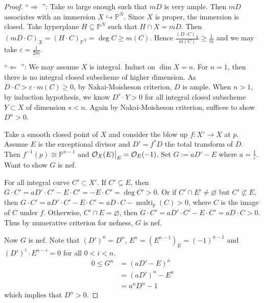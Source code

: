\documentclass{ctexart}
\newcommand{\leftquotes}{\textquotedblleft}
\newcommand{\rightquotes}{\textquotedblright}
\newcommand{\multiplicity}{\operatorname{multi}}
\begin{document}
\begin{proof}
    \leftquotes $\Rightarrow$ \rightquotes : Take $m$ large enough such that $mD$ is very ample.
    Then $mD$ associates with an immersion $X \hookrightarrow \mathbb{P}^{N}$.
    Since $X$ is proper, the immersion is closed.
    Take hyperplane $H \subseteq \mathbb{P}^{N}$ such that $H \cap X = mD$.
    Then $(mD \cdot C)_{X} = (H \cdot C)_{\mathbb{P}^{N}} = \deg C \ge m(C)$.
    Hence $\frac{(D \cdot C)_{X}}{m(C)} \ge \frac{1}{m}$ and we may take $\varepsilon = \frac{1}{2m}$. 
    \par
    \leftquotes $\Leftarrow$ \rightquotes : We may assume $X$ is integral.
    Induct on $\dim X = n$.
    For $n = 1$, then there is no integral closed subscheme of higher dimension.
    As $D \cdot C > \varepsilon \cdot m(C) \ge 0$, by Nakai-Moisheson criterion, $D$ is ample.
    When $n > 1$, by induction hypothesis, we know $D^{s} \cdot Y > 0$ for all integral closed subscheme $Y \subset X$ of dimension $s < n$.
    Again by Nakai-Moisheson criterion, suffices to show $D^{n} > 0$.
    \par
    Take a smooth closed point of $X$ and consider the blow up $f: X' \rightarrow X$ at $p$.
    Assume $E$ is the exceptional divisor and $D' = f^{\ast}D$ the total transform of $D$.
    Then $f^{-1}(p) \cong \mathbb{P}^{n - 1}$ and $\mathcal{O}_{X}(E)\big{|}_{E} = \mathcal{O}_{E}(-1)$.
    Set $G := aD' - E$ where $a = \frac{1}{\varepsilon}$.
    Want to show $G$ is nef.
    \par
    For all integral curve $C' \subset X'$.
    If $C' \subseteq E$, then $G \cdot C' = aD' \cdot C' - E \cdot C' = -E \cdot C' = \deg C' > 0$.
    Or if $C' \cap E' \neq \varnothing$ but $C' \not\subset E$, then $G \cdot C' = aD' \cdot C' - E \cdot C' = aD \cdot C - \multiplicity_{p}(C) > 0$,
    where $C$ is the image of $C$ under $f$.
    Otherwise, $C' \cap E = \varnothing$, then $G \cdot C' = aD' \cdot C' - E \cdot C' = aD \cdot C > 0$.
    Thus by numerative criterion for nefness, $G$ is nef.
    \par
    Now $G$ is nef.
    Note that $(D')^{n} = D^{n}$, $E^{n} = (E^{n - 1})_{E} = (-1)^{n - 1}$ and $(D')^{i} \cdot E^{n - i} = 0$ for all $0 < i < n$.
    \begin{equation}
        \begin{split}
            0 \le G^{n} & = (aD' - E)^{n} \\
            & = (aD')^{n} - E^{n} \\
            & = a^{n}D^{n} - 1
        \end{split}
    \end{equation}
    which implies that $D^{n} > 0$.
\end{proof}
\end{document}
